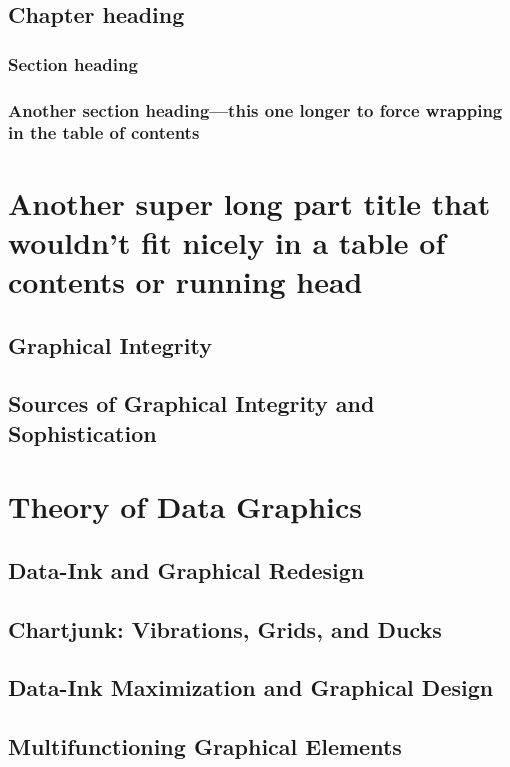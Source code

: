 \documentclass{bayeshyp}
\begin{document}
\chapter{Chapter heading}
\section{Section heading}
\section{Another section heading---this one longer to force wrapping in the table of contents}
\lipsum

\part[toc={Old-style, short title=this}]{Another super long part title that wouldn't fit nicely in a table of contents or running head}

\chapter{Graphical Integrity}
\setcounter{page}{53}

\chapter{Sources of Graphical Integrity and Sophistication}
\setcounter{page}{79}

\part{Theory of Data Graphics}

\chapter{Data-Ink and Graphical Redesign}
\setcounter{page}{91}

\chapter{Chartjunk: Vibrations, Grids, and Ducks}
\setcounter{page}{107}

\chapter{Data-Ink Maximization and Graphical Design}
\setcounter{page}{123}

\chapter{Multifunctioning Graphical Elements}
\setcounter{page}{139}
\end{document}
